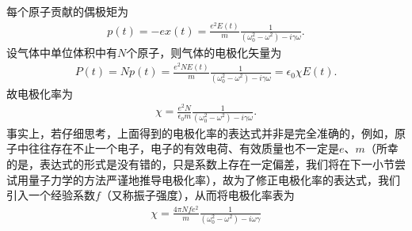 \documentclass{assignment}
\begin{document}
每个原子贡献的偶极矩为
\begin{align}
    p(t)=-ex(t)=\frac{e^2E(t)}{m}\frac{1}{(\omega_0^2-\omega^2)-i\gamma\omega}.
\end{align}
设气体中单位体积中有$N$个原子，则气体的电极化矢量为
\begin{align}
    P(t)=Np(t)=\frac{e^2NE(t)}{m}\frac{1}{(\omega_0^2-\omega^2)-i\gamma\omega}=\epsilon_0\chi E(t).
\end{align}
故电极化率为
\begin{align}
    \chi=\frac{e^2N}{\epsilon_0m}\frac{1}{(\omega_0^2-\omega^2)-i\gamma\omega}.
\end{align}
事实上，若仔细思考，上面得到的电极化率的表达式并非是完全准确的，例如，原子中往往存在不止一个电子，电子的有效电荷、有效质量也不一定是$e$、$m$（所幸的是，表达式的形式是没有错的，只是系数上存在一定偏差，我们将在下一小节尝试用量子力学的方法严谨地推导电极化率），故为了修正电极化率的表达式，我们引入一个经验系数$f$（又称振子强度），从而将电极化率表为
\begin{align}
    \chi=\frac{4\pi Nfe^2}{m}\frac{1}{(\omega_0^2-\omega^2)-i\omega\gamma}
\end{align}
\end{document}
